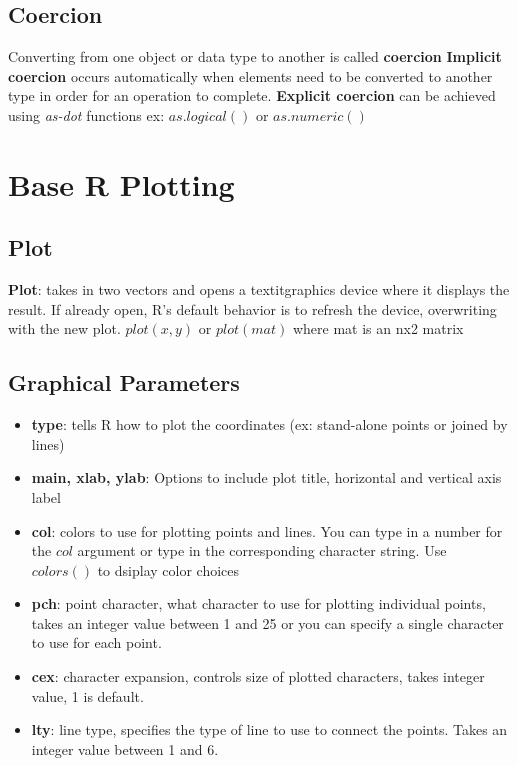 \documentclass[openany]{book}
\begin{document}
\begin{flushleft}
\section{Coercion}
Converting from one object or data type to another is called \textbf{coercion} \medbreak
\textbf{Implicit coercion} occurs automatically when elements need to be converted to another type in order for an operation to complete. \medbreak
\textbf{Explicit coercion} can be achieved using \textit{as-dot} functions \medbreak
ex: $as.logical()$ or $as.numeric()$
\chapter{Base R  Plotting}
\section{Plot}
\textbf{Plot}: takes in two vectors and opens a textit{graphics device} where it displays the result. If already open, R's default behavior is to refresh the device, overwriting with the new plot. \medbreak
$plot(x,y)$ or $plot(mat)$ where mat is an nx2 matrix
\section{Graphical Parameters}
\begin{itemize}
\item \textbf{type}: tells R how to plot the coordinates (ex: stand-alone points or joined by lines) 

\item \textbf{main, xlab, ylab}: Options to include plot title, horizontal and vertical axis label

\item \textbf{col}: colors to use for plotting points and lines. You can type in a number for the $col$ argument or type in the corresponding character string. Use $colors()$ to dsiplay color choices

\item \textbf{pch}: point character, what character to use for plotting individual points, takes an integer value between 1 and 25 or you can specify a single character to use for each point.
\item \textbf{cex}: character expansion, controls size of plotted characters, takes integer value, 1 is default.

\item \textbf{lty}: line type, specifies the type of line to use to connect the points. Takes an integer value between 1 and 6.


\end{itemize}
\end{flushleft}
\end{document}

